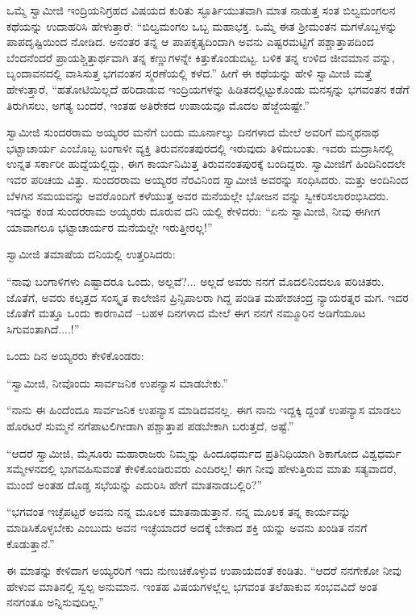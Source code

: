 ಒಮ್ಮೆ ಸ್ವಾಮೀಜಿ ಇಂದ್ರಿಯನಿಗ್ರಹದ ವಿಷಯದ ಕುರಿತು ಸ್ಫೂರ್ತಿಯುತವಾಗಿ ಮಾತ ನಾಡುತ್ತ ಸಂತ ಬಿಲ್ವಮಂಗಲನ ಕಥೆಯನ್ನು ಉದಾಹರಿಸಿ ಹೇಳುತ್ತಾರೆ: “ಬಿಲ್ವಮಂಗಲ ಒಬ್ಬ ಮಹಾಭಕ್ತ. ಒಮ್ಮೆ ಈತ ಶ್ರೀಮಂತನ ಮಗಳೊಬ್ಬಳನ್ನು ಪಾಪದೃಷ್ಟಿಯಿಂದ ನೋಡಿದ. ಅನಂತರ ತನ್ನ ಆ ಪಾಪಕೃತ್ಯದಿಂದಾಗಿ ಅವನು ಎಷ್ಟರಮಟ್ಟಿಗೆ ಪಶ್ಚಾತ್ತಾಪದಿಂದ ಬೆಂದನೆಂದರೆ ಪ್ರಾಯಶ್ಚಿತ್ತಾರ್ಥವಾಗಿ ತನ್ನ ಕಣ್ಣುಗಳನ್ನೇ ಕಿತ್ತುಕೊಂಡುಬಿಟ್ಟ. ಬಳಿಕ ತನ್ನ ಉಳಿದ ಜೀವಮಾನ ವನ್ನು, ಬೃಂದಾವನದಲ್ಲಿ ವಾಸಿಸುತ್ತ ಭಗವಂತನ ಸ್ಮರಣೆಯಲ್ಲಿ ಕಳೆದ.” ಹೀಗೆ ಈ ಕಥೆಯನ್ನು ಹೇಳಿ ಸ್ವಾಮೀಜಿ ಮತ್ತೆ ಹೇಳುತ್ತಾರೆ, “ಹತೋಟಿಯಿಲ್ಲದೆ ಹರಿದಾಡುವ ಇಂದ್ರಿಯಗಳನ್ನು ಹಿಡಿತದಲ್ಲಿಟ್ಟುಕೊಂಡು ಮನಸ್ಸನ್ನು ಭಗವಂತನ ಕಡೆಗೆ ತಿರುಗಿಸಲು, ಅಗತ್ಯ ಬಂದರೆ, ಇಂತಹ ಅತಿರೇಕದ ಉಪಾಯವೂ ಮೊದಲ ಹೆಜ್ಜೆಯಷ್ಟೇ.”

ಸ್ವಾಮೀಜಿ ಸುಂದರರಾಮ ಅಯ್ಯರರ ಮನೆಗೆ ಬಂದು ಮೂರ್ನಾಲ್ಕು ದಿನಗಳಾದ ಮೇಲೆ ಅವರಿಗೆ ಮನ್ಮಥನಾಥ ಭಟ್ಟಾಚಾರ್ಯ ಎಂಬೊಬ್ಬ ಬಂಗಾಳೀ ವ್ಯಕ್ತಿ ತಿರುವನಂತಪುರದಲ್ಲಿ ಇರುವುದು ತಿಳಿದುಬಂತು. ಇವರು ಮದ್ರಾಸಿನಲ್ಲಿ ಉನ್ನತ ಸರ್ಕಾರೀ ಹುದ್ದೆಯಲ್ಲಿದ್ದು, ಈಗ ಕಾರ್ಯನಿಮಿತ್ತ ತಿರುವನಂತಪುರಕ್ಕೆ ಬಂದಿದ್ದರು. ಸ್ವಾಮೀಜಿಗೆ ಹಿಂದಿನಿಂದಲೇ ಇವರ ಪರಿಚಯ ವಿತ್ತು. ಸುಂದರರಾಮ ಅಯ್ಯರರ ನೆರವಿನಿಂದ ಸ್ವಾಮೀಜಿ ಅವರನ್ನು ಸಂಧಿಸಿದರು. ಮತ್ತು ಅಂದಿನಿಂದ ಬೆಳಗಿನ ಸಮಯವನ್ನು ಅವರೊಂದಿಗೆ ಕಳೆಯುತ್ತ ಅವರ ಮನೆಯಲ್ಲೇ ಭೋಜನ ವನ್ನು ಸ್ವೀಕರಿಸಲಾರಂಭಿಸಿದರು. ಇದನ್ನು ಕಂಡ ಸುಂದರರಾಮ ಅಯ್ಯರರು ದೂರುವ ದನಿ ಯಲ್ಲಿ ಕೇಳಿದರು: “ಏನು ಸ್ವಾಮೀಜಿ, ನೀವು ಈಗೀಗ ಯಾವಾಗಲೂ ಭಟ್ಟಾಚಾರ್ಯರ ಮನೆಯಲ್ಲೇ ಇರುತ್ತೀರಲ್ಲ!”

ಸ್ವಾಮೀಜಿ ತಮಾಷೆಯ ದನಿಯಲ್ಲಿ ಉತ್ತರಿಸಿದರು:

“ನಾವು ಬಂಗಾಳಿಗಳು ಎಷ್ಟಾದರೂ ಒಂದು, ಅಲ್ಲವೆ?... ಅಲ್ಲದೆ ಅವರು ನನಗೆ ಮೊದಲಿನಿಂದಲೂ ಪರಿಚಿತರು. ಜೊತೆಗೆ, ಅವರು ಕಲ್ಕತ್ತದ ಸಂಸ್ಕೃತ ಕಾಲೇಜಿನ ಪ್ರಿನ್ಸಿಪಾಲರಾ ಗಿದ್ದ ಪಂಡಿತ ಮಹೇಶಚಂದ್ರ ನ್ಯಾಯರತ್ನರ ಮಗ. ಇದರ ಜೊತೆಗೆ ಮತ್ತೂ ಒಂದು ಕಾರಣವಿದೆ –ಬಹಳ ದಿನಗಳಾದ ಮೇಲೆ ಈಗ ನನಗೆ ನಮ್ಮೂರಿನ ಅಡಿಗೆಯೂಟ ಸಿಗುವಂತಾಗಿದೆ....!”

ಒಂದು ದಿನ ಅಯ್ಯರರು ಕೇಳಿಕೊಂಡರು:

“ಸ್ವಾಮೀಜಿ, ನೀವೊಂದು ಸಾರ್ವಜನಿಕ ಉಪನ್ಯಾಸ ಮಾಡಬೇಕು.”

“ನಾನು ಈ ಹಿಂದೆಂದೂ ಸಾರ್ವಜನಿಕ ಉಪನ್ಯಾಸ ಮಾಡಿದವನಲ್ಲ. ಈಗ ನಾನು ಇದ್ದಕ್ಕಿ ದ್ದಂತೆ ಉಪನ್ಯಾಸ ಮಾಡಲು ಹೊರಟರೆ ಸುಮ್ಮನೆ ನಗೆಪಾಟಲಿಗೀಡಾಗಿ ಪಶ್ಚಾತ್ತಾಪ ಪಡಬೇಕಾಗಿ ಬರುತ್ತದೆ, ಅಷ್ಟೆ.”

“ಆದರೆ ಸ್ವಾಮೀಜಿ, ಮೈಸೂರು ಮಹಾರಾಜರು ನಿಮ್ಮನ್ನು ಹಿಂದೂಧರ್ಮದ ಪ್ರತಿನಿಧಿಯಾಗಿ ಶಿಕಾಗೋದ ವಿಶ್ವಧರ್ಮ ಸಮ್ಮೇಳನದಲ್ಲಿ ಭಾಗವಹಿಸುವಂತೆ ಕೇಳಿಕೊಂಡಿರುವರು ಎಂದಿರಲ್ಲ! ಈಗ ನೀವು ಹೇಳುತ್ತಿರುವ ಮಾತು ಸತ್ಯವಾದರೆ, ಮುಂದೆ ಅಂತಹ ದೊಡ್ಡ ಸಭೆಯನ್ನು ಎದುರಿಸಿ ಹೇಗೆ ಮಾತನಾಡಬಲ್ಲಿರಿ?”

“ಭಗವಂತ ಇಚ್ಛೆಪಟ್ಟರೆ ಅವನು ನನ್ನ ಮೂಲಕ ಮಾತನಾಡುತ್ತಾನೆ. ನನ್ನ ಮೂಲಕ ತನ್ನ ಕಾರ್ಯವನ್ನು ಮಾಡಿಸಿಕೊಳ್ಳಬೇಕು ಎಂಬುದು ಅವನ ಇಚ್ಛೆಯಾದರೆ ಅದಕ್ಕೆ ಬೇಕಾದ ಶಕ್ತಿ ಯನ್ನು ಅವನು ಖಂಡಿತ ನನಗೆ ಕೊಡುತ್ತಾನೆ.”

ಈ ಮಾತನ್ನು ಕೇಳಿದಾಗ ಅಯ್ಯರರಿಗೆ ಇದು ನುಣುಚಿಕೊಳ್ಳುವ ಉಪಾಯದಂತೆ ಕಂಡಿತು. “ಆದರೆ ನನಗೇಕೋ ನೀವು ಹೇಳುವ ಮಾತಿನಲ್ಲಿ ಸ್ವಲ್ಪ ಅನುಮಾನ. ಇಂತಹ ವಿಷಯಗಳಲ್ಲೆಲ್ಲ ಭಗವಂತ ತಲೆಹಾಕುವ ಸಂಭವವಿದೆ ಅಂತ ನನಗಂತೂ ಅನ್ನಿಸುವುದಿಲ್ಲ.”

